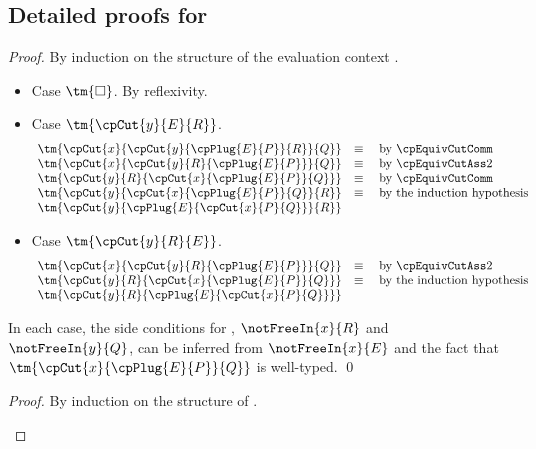 \documentclass[UKenglish]{llncs}
\begin{document}
\clearpage
\appendix
\begin{subappendices}
  \renewcommand{\thesection}{\Alph{section}}%

  \section{Detailed proofs for \cp}
  \thmcpdisplaycut
  \begin{proof}
    By induction on the structure of the evaluation context .
    \begin{itemize}
    \item
      Case $\tm{\Box}$. By reflexivity.
    \item
      Case $\tm{\cpCut{y}{E}{R}}$.
      \[\!
        \begin{array}{ll}
          \tm{\cpCut{x}{\cpCut{y}{\cpPlug{E}{P}}{R}}{Q}} & \equiv \quad \text{by \cpEquivCutComm}\\
          \tm{\cpCut{x}{\cpCut{y}{R}{\cpPlug{E}{P}}}{Q}} & \equiv \quad \text{by \cpEquivCutAss2}\\
          \tm{\cpCut{y}{R}{\cpCut{x}{\cpPlug{E}{P}}{Q}}} & \equiv \quad \text{by \cpEquivCutComm}\\
          \tm{\cpCut{y}{\cpCut{x}{\cpPlug{E}{P}}{Q}}{R}} & \equiv \quad \text{by the induction hypothesis}\\ 
          \tm{\cpCut{y}{\cpPlug{E}{\cpCut{x}{P}{Q}}}{R}} &
        \end{array}
      \]
    \item
      Case $\tm{\cpCut{y}{R}{E}}$.
      \[\!
        \begin{array}{ll}
          \tm{\cpCut{x}{\cpCut{y}{R}{\cpPlug{E}{P}}}{Q}} & \equiv \quad \text{by \cpEquivCutAss2}\\
          \tm{\cpCut{y}{R}{\cpCut{x}{\cpPlug{E}{P}}{Q}}} & \equiv \quad \text{by the induction hypothesis}\\
          \tm{\cpCut{y}{R}{\cpPlug{E}{\cpCut{x}{P}{Q}}}}
        \end{array}
      \]
    \end{itemize}
    In each case, the side conditions for , $\notFreeIn{x}{R}$ and
    $\notFreeIn{y}{Q}$, can be inferred from $\notFreeIn{x}{E}$ and the fact that
    $\tm{\cpCut{x}{\cpPlug{E}{P}}{Q}}$ is well-typed.
    \qed
  \end{proof}
  \thmcpprogresslink
  \begin{proof}
    By induction on the structure of .
    \begin{itemize}

\end{itemize}
\end{proof}
\end{subappendices}
\end{document}
